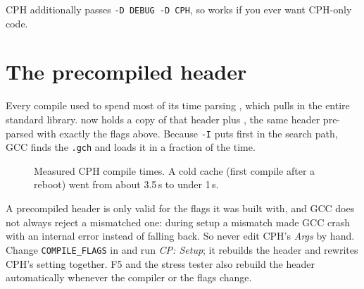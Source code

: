 CPH additionally passes \texttt{-D DEBUG -D CPH}, so  works if you ever want CPH-only code.

\section{The precompiled header}

Every compile used to spend most of its time parsing , which pulls in the entire standard library.
 now holds a copy of that header plus , the same header pre-parsed with exactly
the flags above. Because \texttt{-I} puts  first in the search path, GCC finds the \texttt{.gch} and loads
it in a fraction of the time.

\begin{figure}[H]
\centering
{}
\caption{Measured CPH compile times. A cold cache (first compile after a reboot) went from about 3.5\,s to under 1\,s.}
\end{figure}

\begin{pitfall}
A precompiled header is only valid for the flags it was built with, and GCC does not always reject a mismatched one:
during setup a mismatch made GCC crash with an internal error instead of falling back. So never edit CPH's
\emph{Args} by hand. Change \texttt{COMPILE\_FLAGS} in  and run \emph{CP: Setup}; it rebuilds the
header and rewrites CPH's setting together. F5 and the stress tester also rebuild the header automatically whenever
the compiler or the flags change.
\end{pitfall}

